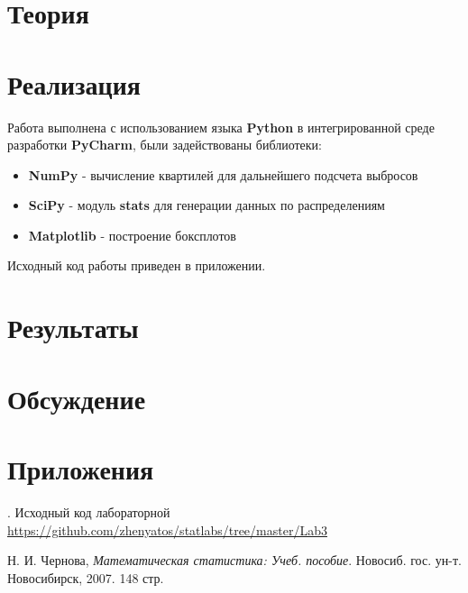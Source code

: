 \documentclass[12pt,a4paper]{article}
\begin{document}
\section{Теория}


\pagebreak

\section{Реализация}
Работа выполнена с использованием языка \textbf{Python} в интегрированной среде разработки \textbf{PyCharm}, были задействованы библиотеки:

\begin{itemize}
	\item \textbf{NumPy} - вычисление квартилей для дальнейшего подсчета выбросов
	\item \textbf{SciPy} - модуль \textbf{stats} для генерации данных по распределениям
	\item \textbf{Matplotlib} - построение боксплотов
\end{itemize}

Исходный код работы приведен в приложении. 
\pagebreak

\section{Результаты}

\pagebreak

\section{Обсуждение}
	
\pagebreak

\section{Приложения}
. Исходный код лабораторной {\url{https://github.com/zhenyatos/statlabs/tree/master/Lab3}}

\begin{thebibliography}{9} 
	 Н. И. Чернова, \emph{Математическая статистика: Учеб. пособие}. Новосиб. гос. ун-т. Новосибирск, 2007. 148 стр.
\end{thebibliography}
\end{document}
